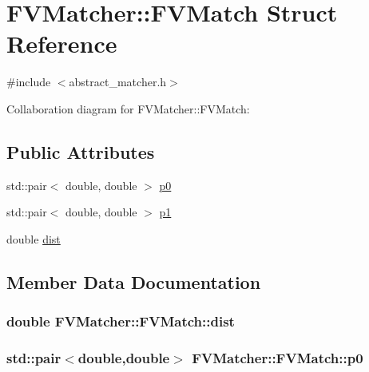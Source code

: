 \hypertarget{structFVMatcher_1_1FVMatch}{}\section{F\+V\+Matcher\+:\+:F\+V\+Match Struct Reference}
\label{structFVMatcher_1_1FVMatch}


{\ttfamily \#include $<$abstract\+\_\+matcher.\+h$>$}



Collaboration diagram for F\+V\+Matcher\+:\+:F\+V\+Match\+:
\subsection*{Public Attributes}
\begin{DoxyCompactItemize}
\item 
std\+::pair$<$ double, double $>$ \hyperlink{structFVMatcher_1_1FVMatch_ad52b55248ac09202d37aeed1d4cde8c5}{p0}
\item 
std\+::pair$<$ double, double $>$ \hyperlink{structFVMatcher_1_1FVMatch_a99228c63852266ed5ef0c7226e178c57}{p1}
\item 
double \hyperlink{structFVMatcher_1_1FVMatch_ac813deae28b0596971efe727e2019e3b}{dist}
\end{DoxyCompactItemize}


\subsection{Member Data Documentation}
\hypertarget{structFVMatcher_1_1FVMatch_ac813deae28b0596971efe727e2019e3b}{}
\subsubsection[{dist}]{\setlength{\rightskip}{0pt plus 5cm}double F\+V\+Matcher\+::\+F\+V\+Match\+::dist}\label{structFVMatcher_1_1FVMatch_ac813deae28b0596971efe727e2019e3b}
\hypertarget{structFVMatcher_1_1FVMatch_ad52b55248ac09202d37aeed1d4cde8c5}{}
\subsubsection[{p0}]{\setlength{\rightskip}{0pt plus 5cm}std\+::pair$<$double,double$>$ F\+V\+Matcher\+::\+F\+V\+Match\+::p0}\label{structFVMatcher_1_1FVMatch_ad52b55248ac09202d37aeed1d4cde8c5}
\hypertarget{structFVMatcher_1_1FVMatch_a99228c63852266ed5ef0c7226e178c57}{}

